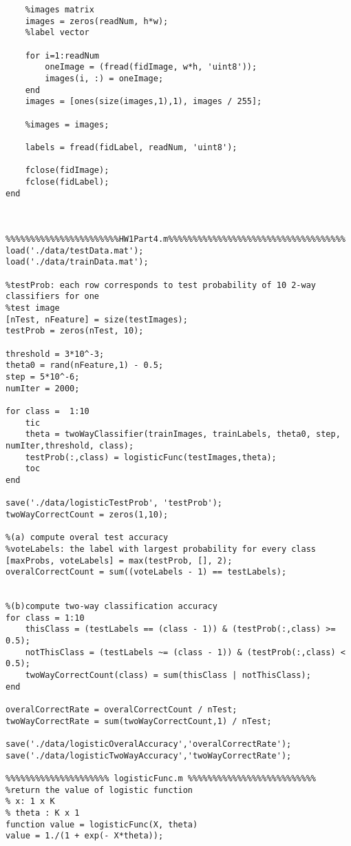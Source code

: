 \documentclass[12pt]{article} %
\theoremstyle{definition}\newtheorem{law}{Law}
\theoremstyle{plain}\newtheorem{jury}[law]{Jury}
\theoremstyle{remark}\newtheorem{juu}{Juu}
\theoremstyle{definition}\newtheorem{kuu}[law]{Kuu}
\theoremstyle{definition}\newtheorem{muu}{Muu}[section]
\theoremstyle{definition}\newtheorem{honoluu}{Honoluu}[section]
\theoremstyle{definition}\newtheorem{konoluu}[muu]{Konoluu}
\begin{document}
\begin{lstlisting}
    %images matrix
    images = zeros(readNum, h*w);
    %label vector
    
    for i=1:readNum
        oneImage = (fread(fidImage, w*h, 'uint8'));
        images(i, :) = oneImage;  
    end
    images = [ones(size(images,1),1), images / 255];
    
    %images = images;
    
    labels = fread(fidLabel, readNum, 'uint8');
    
    fclose(fidImage);   
    fclose(fidLabel);   
end


  
%%%%%%%%%%%%%%%%%%%%%%%HW1Part4.m%%%%%%%%%%%%%%%%%%%%%%%%%%%%%%%%%%%%
load('./data/testData.mat');
load('./data/trainData.mat');

%testProb: each row corresponds to test probability of 10 2-way classifiers for one 
%test image
[nTest, nFeature] = size(testImages);
testProb = zeros(nTest, 10);

threshold = 3*10^-3;
theta0 = rand(nFeature,1) - 0.5;
step = 5*10^-6;
numIter = 2000;

for class =  1:10
    tic
    theta = twoWayClassifier(trainImages, trainLabels, theta0, step, numIter,threshold, class);
    testProb(:,class) = logisticFunc(testImages,theta);
    toc
end

save('./data/logisticTestProb', 'testProb');
twoWayCorrectCount = zeros(1,10);

%(a) compute overal test accuracy
%voteLabels: the label with largest probability for every class
[maxProbs, voteLabels] = max(testProb, [], 2);
overalCorrectCount = sum((voteLabels - 1) == testLabels);


%(b)compute two-way classification accuracy
for class = 1:10
    thisClass = (testLabels == (class - 1)) & (testProb(:,class) >= 0.5);
    notThisClass = (testLabels ~= (class - 1)) & (testProb(:,class) < 0.5);
    twoWayCorrectCount(class) = sum(thisClass | notThisClass);
end            
            
overalCorrectRate = overalCorrectCount / nTest;
twoWayCorrectRate = sum(twoWayCorrectCount,1) / nTest;  

save('./data/logisticOveralAccuracy','overalCorrectRate');
save('./data/logisticTwoWayAccuracy','twoWayCorrectRate');
    
%%%%%%%%%%%%%%%%%%%%% logisticFunc.m %%%%%%%%%%%%%%%%%%%%%%%%%%
%return the value of logistic function
% x: 1 x K
% theta : K x 1
function value = logisticFunc(X, theta)
value = 1./(1 + exp(- X*theta));


\end{lstlisting}
\end{document}
